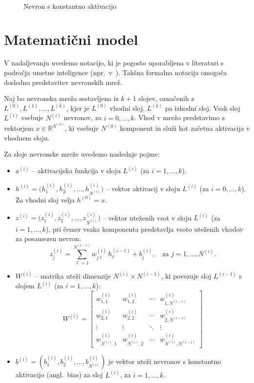 \begin{figure}[H]
  \centering
  
  \caption{Nevron s konstantno aktivacijo}~\label{fig:nn-bias}
\end{figure}


\section{Matematični model}

V nadaljevanju uvedemo notacijo, ki je pogosto uporabljena v literaturi s področja umetne inteligence (npr.~v~\cite{Hastie2009}). Takšna formalna notacija omogoča dosledno predstavitev nevronskih mrež.

Naj bo nevronska mreža sestavljena iz $k+1$ slojev, označenih z $L^{(0)}, L^{(1)}, \dots, L^{(k)}$, kjer je $L^{(0)}$ vhodni sloj, $L^{(k)}$ pa izhodni sloj. Vsak sloj $L^{(i)}$ vsebuje $N^{(i)}$ nevronov, za $i = 0, \dots, k$. Vhod v mrežo predstavimo z vektorjem $x \in \mathbb{R}^{N^{(0)}}$, ki vsebuje $N^{(0)}$ komponent in služi kot začetna aktivacija v vhodnem sloju.

Za sloje nevronske mreže uvedemo naslednje pojme:
\begin{itemize}
  \item $a^{(i)}$ – aktivacijska funkcija v sloju $L^{(i)}$ (za $i = 1, \dots, k$).
  \item $h^{(i)} = \big(h^{(i)}_1, h^{(i)}_2, \dots, h^{(i)}_{N^{(i)}}\big)$ – vektor aktivacij v sloju $L^{(i)}$ (za $i = 0, \dots, k$). Za vhodni sloj velja $h^{(0)} = x$.
  \item $z^{(i)} = \big(z^{(i)}_1, z^{(i)}_2, \dots, z^{(i)}_{N^{(i)}}\big)$ – vektor uteženih vsot v sloju $L^{(i)}$ (za $i = 1, \dots, k$), pri čemer vsaka komponenta predstavlja vsoto uteženih vhodov za posamezen nevron:
  \[
    z^{(i)}_j = \sum_{\ell=1}^{N^{(i-1)}} w^{(i)}_{j\ell}\, h^{(i-1)}_\ell + b^{(i)}_j, \quad \text{za } j = 1, \dots, N^{(i)}.
  \]
  \item $W^{(i)}$ – matrika uteži dimenzije $N^{(i)} \times N^{(i-1)}$, ki povezuje sloj $L^{(i-1)}$ s slojem $L^{(i)}$ (za $i = 1, \dots, k$):
  \[
    W^{(i)} = \begin{bmatrix}
      w^{(i)}_{1,1} & w^{(i)}_{1,2} & \cdots & w^{(i)}_{1,N^{(i-1)}} \\
      w^{(i)}_{2,1} & w^{(i)}_{2,2} & \cdots & w^{(i)}_{2,N^{(i-1)}} \\
      \vdots       & \vdots       & \ddots & \vdots               \\
      w^{(i)}_{N^{(i)},1} & w^{(i)}_{N^{(i)},2} & \cdots & w^{(i)}_{N^{(i)},N^{(i-1)}}
    \end{bmatrix}
  \]

  \item $b^{(i)} = \left(b^{(i)}_1, b^{(i)}_2, \dots, b^{(i)}_{N^{(i)}}\right)$ je vektor uteži nevronov s konstantno aktivacijo (angl.\ bias) za sloj $L^{(i)}$, za $i = 1, \dots, k$.
\end{itemize}

